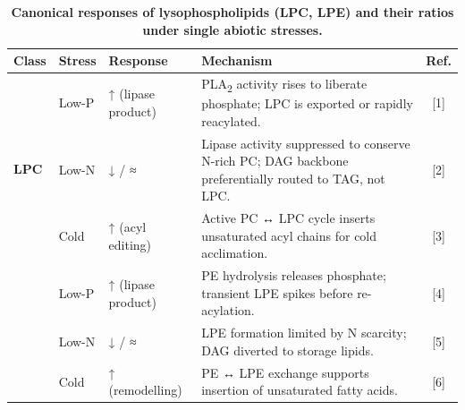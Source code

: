 \documentclass[10pt,letterpaper]{article}
\begin{document}
\begin{table}[!ht]
  \begin{adjustwidth}{-2.25in}{0in}  %
    \centering
    \caption{\bf Canonical responses of lysophospholipids (LPC, LPE) and their ratios under single abiotic stresses.}
    \label{table:lyso_combined}
    \vspace{-0.5em}
    \begin{tabularx}{\textwidth}{@{} l l p{3.5cm} X c @{}}
      \toprule
      \textbf{Class} & \textbf{Stress} & \textbf{Response} & \textbf{Mechanism} & \textbf{Ref.} \\
      \midrule
      \multirow{3}{*}{\textbf{LPC}}
        & Low-P  & ↑ (lipase product) & PLA\textsubscript{2} activity rises to liberate phosphate; LPC is exported or rapidly reacylated. & [1] \\
        & Low-N  & ↓ / ≈              & Lipase activity suppressed to conserve N-rich PC; DAG backbone preferentially routed to TAG, not LPC. & [2] \\
        & Cold   & ↑ (acyl editing)   & Active PC ↔ LPC cycle inserts unsaturated acyl chains for cold acclimation. & [3] \\
      \addlinespace
      \multirow{3}{*}{\textbf{LPE}}
        & Low-P  & ↑ (lipase product) & PE hydrolysis releases phosphate; transient LPE spikes before re-acylation. & [4] \\
        & Low-N  & ↓ / ≈              & LPE formation limited by N scarcity; DAG diverted to storage lipids. & [5] \\
        & Cold   & ↑ (remodelling)    & PE ↔ LPE exchange supports insertion of unsaturated fatty acids. & [6] \\
      \bottomrule
    \end{tabularx}

    \vspace{1em}


\end{adjustwidth}
\end{table}
\end{document}
